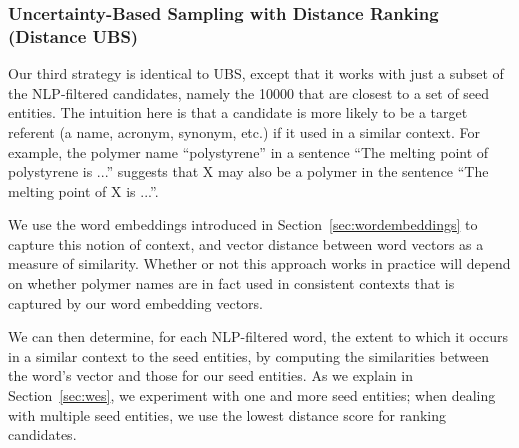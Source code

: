 \subsubsection{Uncertainty-Based Sampling with Distance Ranking (Distance UBS)}
Our third strategy is identical to UBS, except that it works with just a subset of the NLP-filtered candidates,
namely the \num{10000} that are closest to a set of seed entities. 
The intuition here is that a candidate is more likely to be a target referent 
(a name, acronym, synonym, etc.) if it used in a similar context.
For example, the polymer name ``polystyrene'' in a sentence ``The
melting point of polystyrene is ...'' suggests that X may also be a polymer in the
sentence ``The melting point of X is ...''.

We use the word embeddings introduced in Section~\ref{sec:wordembeddings} to capture this notion of context,
and vector distance between word vectors as a measure of similarity.
Whether or not this approach works in practice will depend on whether 
polymer names are in fact used in consistent contexts that is captured by our 
word embedding  vectors. 

We can then determine, for each NLP-filtered word, the extent to which it occurs
in a similar context to the seed entities, by computing the similarities
between the word's vector and those for our seed entities. 
As we explain in Section~\ref{sec:wes}, we experiment with one and more seed entities; 
when dealing with multiple seed entities,
we use the lowest distance score for ranking candidates.

